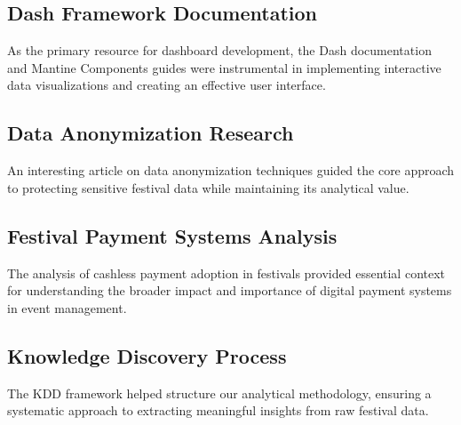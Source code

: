 \small{}

\subsection*{Dash Framework Documentation}
\label{subsec:dash-framework-documentation}
As the primary resource for dashboard development, the Dash documentation and Mantine Components guides were instrumental in implementing interactive data visualizations and creating an effective user interface.

\small{}
\small{}

\subsection*{Data Anonymization Research}
\label{subsec:data-anonymization-research}
An interesting article on data anonymization techniques guided the core approach to protecting sensitive festival data while maintaining its analytical value.

\begin{flushleft}
	\small{}
\end{flushleft}

\subsection*{Festival Payment Systems Analysis}
\label{subsec:festival-payment-systems-analysis}
The analysis of cashless payment adoption in festivals provided essential context for understanding the broader impact and importance of digital payment systems in event management.

\small{}

\subsection*{Knowledge Discovery Process}
\label{subsec:knowledge-discovery-process}
The KDD framework helped structure our analytical methodology, ensuring a systematic approach to extracting meaningful insights from raw festival data.

\small{}

\pagebreak[4]

